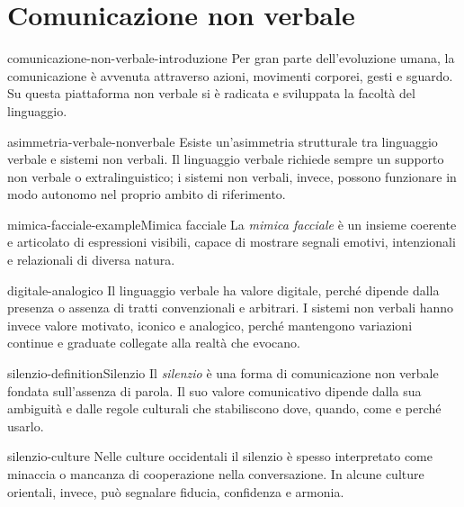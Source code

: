 \documentclass[preview]{standalone}
\begin{document}
\genpage

\section{Comunicazione non verbale}

\begin{snippet}{comunicazione-non-verbale-introduzione}
    Per gran parte dell'evoluzione umana, la comunicazione è avvenuta attraverso
    azioni, movimenti corporei, gesti e sguardo. Su questa piattaforma non
    verbale si è radicata e sviluppata la facoltà del linguaggio.
\end{snippet}

\begin{snippet}{asimmetria-verbale-nonverbale}
    Esiste un'asimmetria strutturale tra linguaggio verbale e sistemi non
    verbali. Il linguaggio verbale richiede sempre un supporto non verbale o
    extralinguistico; i sistemi non verbali, invece, possono funzionare in modo
    autonomo nel proprio ambito di riferimento.
\end{snippet}

\begin{snippetexample}{mimica-facciale-example}{Mimica facciale}
    La \emph{mimica facciale} è un insieme coerente e articolato di espressioni
    visibili, capace di mostrare segnali emotivi, intenzionali e relazionali di
    diversa natura.
\end{snippetexample}

\begin{snippet}{digitale-analogico}
    Il linguaggio verbale ha valore digitale, perché dipende dalla presenza o
    assenza di tratti convenzionali e arbitrari. I sistemi non verbali hanno
    invece valore motivato, iconico e analogico, perché mantengono variazioni
    continue e graduate collegate alla realtà che evocano.
\end{snippet}

\begin{snippetdefinition}{silenzio-definition}{Silenzio}
    Il \emph{silenzio} è una forma di comunicazione non verbale fondata
    sull'assenza di parola. Il suo valore comunicativo dipende dalla sua
    ambiguità e dalle regole culturali che stabiliscono dove, quando, come e
    perché usarlo.
\end{snippetdefinition}

\begin{snippet}{silenzio-culture}
    Nelle culture occidentali il silenzio è spesso interpretato come minaccia o
    mancanza di cooperazione nella conversazione. In alcune culture orientali,
    invece, può segnalare fiducia, confidenza e armonia.
\end{snippet}
\end{document}
